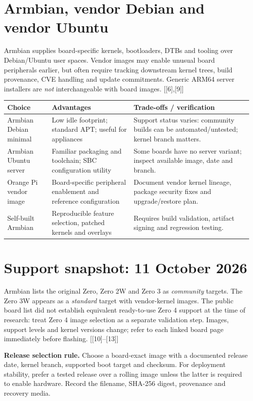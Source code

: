 \documentclass[10pt,oneside,openany]{report}
\newcommand{\smallref}[1]{{\sffamily\scriptsize\color{slate}[#1]}}
\begin{document}
\section{Armbian, vendor Debian and vendor Ubuntu}
Armbian supplies board-specific kernels, bootloaders, DTBs and tooling over Debian/Ubuntu user spaces. Vendor images may enable unusual board peripherals earlier, but often require tracking downstream kernel trees, build provenance, CVE handling and update commitments. Generic ARM64 server installers are \emph{not} interchangeable with board images. \smallref{[6],[9]}
\begin{center}\small\begin{tabularx}{\textwidth}{@{}>{\raggedright\arraybackslash}p{2.35cm}>{\raggedright\arraybackslash}X >{\raggedright\arraybackslash}X@{}}\toprule
\textbf{Choice} & \textbf{Advantages} & \textbf{Trade-offs / verification}\\\midrule
Armbian Debian minimal & Low idle footprint; standard APT; useful for appliances & Support status varies: community builds can be automated/untested; kernel branch matters.\\
Armbian Ubuntu server & Familiar packaging and toolchain; SBC configuration utility & Some boards have no server variant; inspect available image, date and branch.\\
Orange Pi vendor image & Board-specific peripheral enablement and reference configuration & Document vendor kernel lineage, package security fixes and upgrade/restore plan.\\
Self-built Armbian & Reproducible feature selection, patched kernels and overlays & Requires build validation, artifact signing and regression testing.\\\bottomrule\end{tabularx}\end{center}
\section{Support snapshot: 11 October 2026}
Armbian lists the original Zero, Zero 2W and Zero 3 as \emph{community} targets. The Zero 3W appears as a \emph{standard} target with vendor-kernel images. The public board list did not establish equivalent ready-to-use Zero 4 support at the time of research: treat Zero 4 image selection as a separate validation step. Images, support levels and kernel versions change; refer to each linked board page immediately before flashing. \smallref{[10]--[13]}
\begin{fieldnote}
\textbf{Release selection rule.} Choose a board-exact image with a documented release date, kernel branch, supported boot target and checksum. For deployment stability, prefer a tested release over a rolling image unless the latter is required to enable hardware. Record the filename, SHA-256 digest, provenance and recovery media.
\end{fieldnote}
\end{document}
